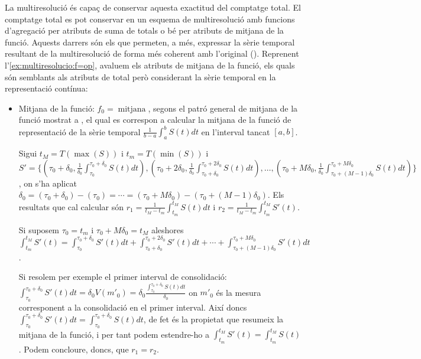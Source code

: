 La multiresolució és capaç de conservar aquesta exactitud del
comptatge total.  El comptatge total es pot conservar en un esquema de
multiresolució amb funcions d'agregació per atributs de suma de totals
o bé per atributs de mitjana de la funció. Aquests darrers són els que
permeten, a més, expressar la sèrie temporal resultant de la
multiresolució de forma més coherent amb l'original
(). Reprenent
l'\autoref{ex:multiresolucio:f=op}, avaluem els atributs de mitjana de
la funció, els quals són semblants als atributs de total però
considerant la sèrie temporal en la representació contínua:
  
  \begin{itemize}


  \item Mitjana de la funció: $f_0=\operatorname{mitjana}$, segons el
    patró general de mitjana de la funció mostrat a
    , el qual es correspon a calcular
    la mitjana de la funció de representació de la sèrie temporal
    $\frac{1}{b-a} \int_{a}^{b} S(t)dt$ en l'interval tancat $[a,b]$.

    Sigui $t_M=T(\max(S))$ i $t_m=T(\min(S))$ i $S'= \{
    (\tau_0+\delta_0, \frac{1}{\delta_0}
    \int_{\tau_0}^{\tau_0+\delta_0} S(t) dt), (\tau_0+2\delta_0,
     \frac{1}{\delta_0}\int_{\tau_0+\delta_0}^{\tau_0+2\delta_0} S(t) dt), \dotsc,
    (\tau_0+M\delta_0, \frac{1}{\delta_0}
    \int_{\tau_0+(M-1)\delta_0}^{\tau_0+M\delta_0} S(t) dt )\}$, on
    s'ha aplicat $\delta_0= (\tau_0+\delta_0)-(\tau_0)=\dotsb=
    (\tau_0+M\delta_0)-(\tau_0+(M-1)\delta_0)$.  Els resultats que cal
    calcular són $r_1=\frac{1}{t_M-t_m} \int_{t_m}^{t_M} S(t)dt$ i
    $r_2 = \frac{1}{t_M-t_m} \int_{t_m}^{t_M} S'(t)$.

    Si suposem $\tau_0=t_m$ i $\tau_0+M\delta_0=t_M$ aleshores
    $\int_{t_m}^{t_M} S'(t) = \int_{\tau_0}^{\tau_0+\delta_0} S'(t) dt + \int_{\tau_0+\delta_0}^{\tau_0+2\delta_0} S'(t) dt + \dotsb + \int_{\tau_0+(M-1)\delta_0}^{\tau_0+M\delta_0}
    S'(t) dt$.  
    
    Si resolem per exemple el primer interval de consolidació: $
    \int_{\tau_0}^{\tau_0+\delta_0} S'(t) dt = \delta_0V(m'_0) =
    \delta_0 \frac{ \int_{\tau_0}^{\tau_0+\delta_0} S(t)
      dt}{\delta_0}$ on $m'_0$ és la mesura corresponent a la
    consolidació en el primer interval. Així doncs
    $\int_{\tau_0}^{\tau_0+\delta_0} S'(t) dt =
    \int_{\tau_0}^{\tau_0+\delta_0} S(t) dt$, de fet és la propietat
    que resumeix la mitjana de la funció, i per tant podem estendre-ho
    a $\int_{t_m}^{t_M} S'(t)= \int_{t_m}^{t_M} S(t)$. Podem
    concloure, doncs, que $r_1=r_2$.



\end{itemize}
